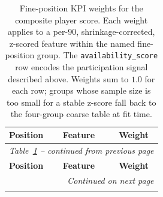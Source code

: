 \begin{small}
\begin{longtable}{|l|l|c|}
\caption{Fine-position KPI weights for the composite player score. Each weight applies to a per-90, shrinkage-corrected, z-scored feature within the named fine-position group. The \texttt{availability\_score} row encodes the participation signal described above. Weights sum to $1.0$ for each row; groups whose sample size is too small for a stable z-score fall back to the four-group coarse table at fit time.}
\label{tab:xi_weights} \\
\hline
\textbf{Position} & \textbf{Feature} & \textbf{Weight} \\
\hline
\endfirsthead

\hline
\multicolumn{3}{|l|}{\textit{Table~\ref{tab:xi_weights} -- continued from previous page}} \\
\hline
\textbf{Position} & \textbf{Feature} & \textbf{Weight} \\
\hline
\endhead

\hline
\multicolumn{3}{|r|}{\textit{Continued on next page}} \\
\hline
\endfoot

\hline
\endlastfoot


\end{longtable}
\end{small}
